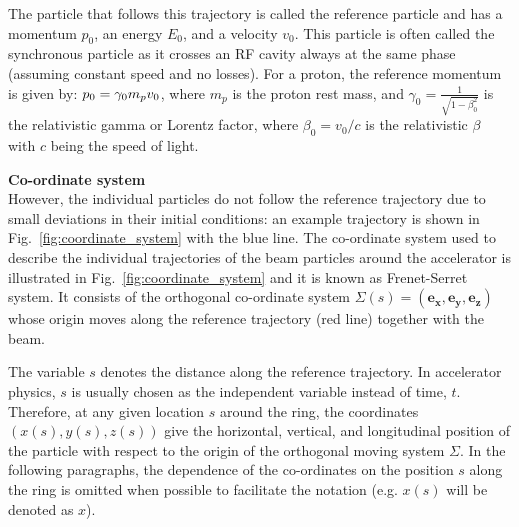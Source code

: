
The particle that follows this trajectory is called the reference particle and has a momentum $p_0$, an energy $E_0$, and a velocity $v_0$. This particle is often called the synchronous particle as it crosses an RF cavity always at the same phase (assuming constant speed and no losses). %
For a proton, the reference momentum is given by: $p_0 = {\gamma_0} m_p v_0$, where $m_p$ is the proton rest mass, and $\gamma_0 = \frac{1}{\sqrt{1-\beta_0^2}}$ is the relativistic gamma or Lorentz factor, where $\beta_0=v_0/c$ is the relativistic $\beta$ with $c$ being the speed of light. 


\textbf{Co-ordinate system}\\
However, the individual particles do not follow the reference trajectory due to small deviations in their initial conditions: an example trajectory is shown in Fig.~\ref{fig:coordinate_system} with the blue line. The co-ordinate system used to describe the individual trajectories of the beam particles around the accelerator is illustrated in Fig.~\ref{fig:coordinate_system} and it is known as Frenet-Serret system.  It consists of the orthogonal co-ordinate system $\Sigma(s) = (\mathbf{e_x}, \mathbf{e_y}, \mathbf{e_z})$ whose origin moves along the reference trajectory (red line) together with the beam. 

The variable $s$ denotes the distance along the reference trajectory. In accelerator physics, $s$ is usually chosen as the independent variable instead of time, $t$.  %
Therefore, at any given location $s$ around the ring, the coordinates $(x(s), y(s), z(s))$ give the horizontal, vertical, and longitudinal position of the particle with respect to the origin of the orthogonal moving system $\Sigma$. In the following paragraphs, the dependence of the co-ordinates on the position $s$ along the ring is omitted when possible to facilitate the notation (e.g. $x(s)$ will be denoted as $x$).

